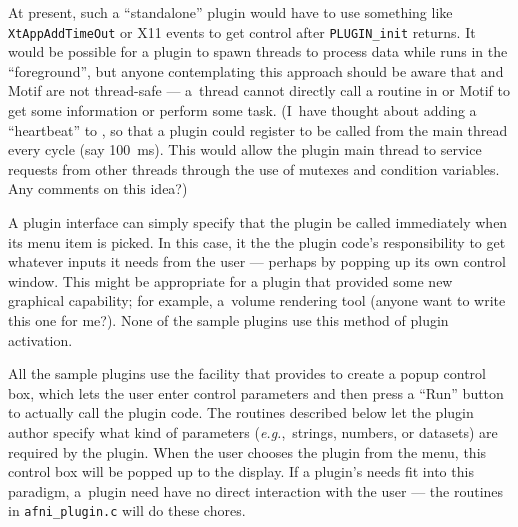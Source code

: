 At present, such a ``standalone'' plugin would have to use something
like {\tt XtAppAddTimeOut} or X11 events to get control after {\tt PLUGIN\_init}
returns.  It would be possible for a plugin to spawn threads to process
data while \afnit runs in the ``foreground'', but anyone contemplating
this approach should be aware that \afnit and Motif are not thread-safe ---
a~thread cannot directly call a routine in \afnit or Motif to get some
information or perform some task.
(I~have thought about adding a ``heartbeat'' to \afnit, so that a plugin
could register to be called from the \afnit main thread every cycle
(say 100~ms).  This would allow the plugin main thread to service
requests from other threads through the use of mutexes and condition variables.
Any comments on this idea?)

A plugin interface can simply specify that the plugin be called immediately
when its menu item is picked.  In this case, it the the plugin code's
responsibility to get whatever inputs it needs from the user --- perhaps
by popping up its own control window.  This might be appropriate for a plugin
that provided some new graphical capability; for example, a~volume rendering
tool (anyone want to write this one for me?).  None of the sample plugins
use this method of plugin activation.

All the sample plugins use the facility that \afnit provides to create
a popup control box, which lets the user enter control parameters
and then press a ``Run'' button to actually call the plugin code.
The routines described below let the plugin author specify what
kind of parameters ({\it e.g.},~strings, numbers, or datasets) are
required by the plugin.
When the user chooses the plugin from the \afnit menu, this
control box will be popped up to the display.
If a plugin's needs fit into
this paradigm, a~plugin need have no direct interaction with the user --- the
routines in {\tt afni\_plugin.c} will do these chores.

